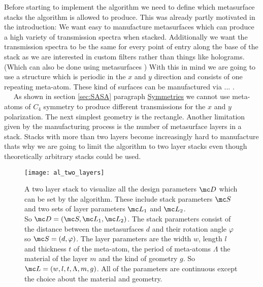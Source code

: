 Before starting to implement the algorithm we need to define which metasurface stacks the algorithm is allowed to produce. This was already partly motivated in the introduction: We want easy to manufacture metasurfaces which can produce a high variety of transmission spectra when stacked. Additionally we want the transmission spectra to be the same for every point of entry along the base of the stack as we are interested in custom filters rather than things like holograms. (Which can also be done using metasurfaces \cite{Mueller2017})
With this in mind we are going to use a structure which is periodic in the
$x$ and $y$ direction and consists of one repeating meta-atom. These kind of surfaces can be manufactured via ... .
\\

$\quad$ As shown in section \ref{sec:SASA} paragraph \hyperref[sec:symmetries]{Symmetries} we cannot use meta-atoms of $C_4$ symmetry to produce different transmissions for the $x$ and $y$ polarization. The next simplest geometry is the rectangle. Another limitation given by the manufacturing process is the number of metasurface layers in a stack. Stacks with more than two layers become increasingly hard to manufacture thats why we are going to limit the algorithm to two layer stacks even though theoretically arbitrary stacks could be used.
\\

\begin{figure}[H]
    \centering
    \texttt{[image: al\_two\_layers]}
    \caption{A two layer stack to visualize all the design parameters
    $\mc D$ which can be set by the algorithm. These include stack parameters $\mc S$ and two sets of layer parameters $\mc L_1$ and $\mc L_2$.\\
    So $\mc D = (\mc S, \mc L_1, \mc L_2)$. The stack parameters consist of the distance between the metasurfaces $d$ and their rotation angle $\varphi$ so $\mc S = (d, \varphi)$. The layer parameters are the width $w$, length $l$ and thickness $t$ of the meta-atom, the period of meta-atoms $\Lambda$ the  material of the layer $m$ and the kind of geometry $g$. So $\mc L = (w,l,t,\Lambda,m,g)$. All of the parameters are continuous except the choice about the material and geometry.}
    \label{fig:al:two_layers}
\end{figure}


